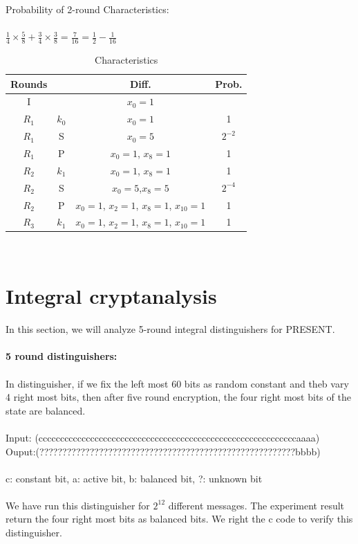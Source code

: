 \documentclass[journal=tosc,preprint]{iacrtrans}
\begin{document}
	Probability of 2-round Characteristics:\\\\
	$\frac{1}{4} \times \frac{5}{8}+\frac{3}{4} \times \frac{3}{8}=\frac{7}{16}=\frac{1}{2}-\frac{1}{16}$\\
\begin{table}[h!]
	\caption{Characteristics}
	\centering
	\begin{tabular}{ |c||c|c|c| }
		\hline
		Rounds & & Diff. & Prob. \\ \hline \hline
		I& & $x_0 = 1$ &  \\ 
		$R_1$& $k_0$ & $x_0 = 1$ & 1 \\
		$R_1$& S & $x_0 = 5$ & $2^{-2}$ \\
		$R_1$& P & $x_0 = 1$, $x_{8} = 1$ & 1 \\
		$R_2$& $k_1$ & $x_0 = 1$, $x_{8} = 1$ & 1 \\
		$R_2$& S & $x_0 = 5$,$x_8 = 5$ & $2^{-4}$ \\
		$R_2$& P & $x_0 = 1$, $x_2 = 1$, $x_8 = 1$, $x_{10} = 1$ & 1 \\
		$R_3$& $k_1$ & $x_0 = 1$, $x_2 = 1$, $x_8 = 1$, $x_{10} = 1$ & 1 \\
		 \hline
	\end{tabular}\\
\end{table}
\newpage
\section{Integral cryptanalysis}
In this section, we will analyze 5-round integral distinguishers for PRESENT.\\\\
\textbf{5 round distinguishers:}\\\\
In distinguisher, if we fix the left most 60 bits as random constant and theb vary 4 right most bits, then after five round encryption, the four right most bits of the state are balanced.\\\\
Input: (ccccccccccccccccccccccccccccccccccccccccccccccccccccccccccccaaaa)\\
Ouput:(????????????????????????????????????????????????????????bbbb)\\\\
c: constant bit, a: active bit, b: balanced bit, ?: unknown bit\\\\
We have run this distinguisher for $2^{12}$ different messages. The experiment result return the four right most bits as balanced bits. We right the c code to verify this distinguisher.
\end{document}
